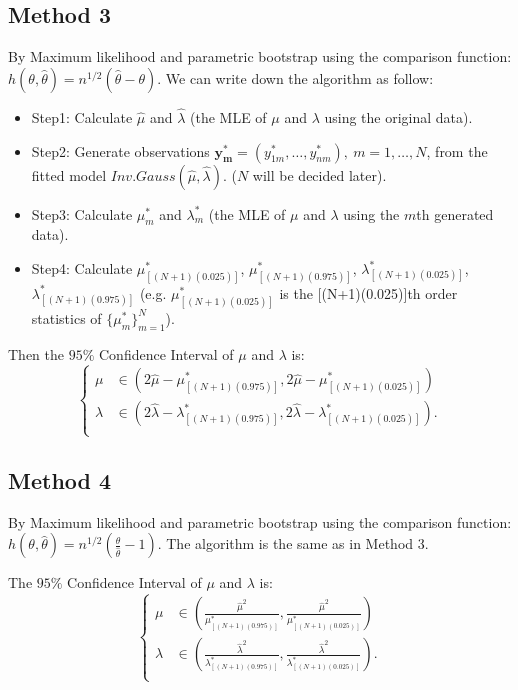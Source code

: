 \documentclass[12pt]{article}
\begin{document}
\subsection{Method 3}
By Maximum likelihood and parametric bootstrap using the comparison function: $h(\theta,\hat{\theta})=n^{1/2}(\hat{\theta}-\theta)$. We can write down the algorithm as follow:
\begin{itemize}
  \item Step1: Calculate $\hat{\mu}$ and $\hat{\lambda}$ (the MLE of $\mu$ and $\lambda$ using the original data).
  \item Step2: Generate observations $\pmb{y_{m}^{*}}=(y_{1m}^{*},\dots,y_{nm}^{*}), \ m=1,\dots,N$, from the fitted model $Inv.Gauss(\hat{\mu},\hat{\lambda})$. ($N$ will be decided later).
  \item Step3: Calculate $\mu_{m}^{*}$ and $\lambda_{m}^{*}$ (the MLE of $\mu$ and $\lambda$ using the $m$th generated data).
  \item Step4: Calculate $\mu_{[(N+1)(0.025)]}^{*}$, $\mu_{[(N+1)(0.975)]}^{*}$, $\lambda_{[(N+1)(0.025)]}^{*}$, $\lambda_{[(N+1)(0.975)]}^{*}$ (e.g. $\mu_{[(N+1)(0.025)]}^{*}$ is the [(N+1)(0.025)]th order statistics of $\{\mu_{m}^{*}\}_{m=1}^{N}$).
\end{itemize}

Then the $95\%$ Confidence Interval of $\mu$ and $\lambda$ is: 
 \begin{equation*}
\left\{                         
\begin{aligned}
\mu &\in (2\hat{\mu}-\mu_{[(N+1)(0.975)]}^{*},2\hat{\mu}-\mu_{[(N+1)(0.025)]}^{*})\\
\lambda &\in (2\hat{\lambda}-\lambda_{[(N+1)(0.975)]}^{*},2\hat{\lambda}-\lambda_{[(N+1)(0.025)]}^{*}).\\
\end{aligned}
\right.
\end{equation*}


\subsection{Method 4}
By Maximum likelihood and parametric bootstrap using the comparison function: $h(\theta,\hat{\theta})=n^{1/2}(\frac{\theta}{\hat{\theta}}-1)$. The algorithm is the same as in Method 3.

The $95\%$ Confidence Interval of $\mu$ and $\lambda$ is: 
 \begin{equation*}
\left\{                         
\begin{aligned}
\mu &\in (\frac{\hat{\mu}^2}{\mu_{[(N+1)(0.975)]}^{*}},\frac{\hat{\mu}^2}{\mu_{[(N+1)(0.025)]}^{*}})\\
\lambda &\in (\frac{\hat{\lambda}^2}{\lambda_{[(N+1)(0.975)]}^{*}},\frac{\hat{\lambda}^2}{\lambda_{[(N+1)(0.025)]}^{*}}).\\
\end{aligned}
\right.
\end{equation*}
\end{document}
